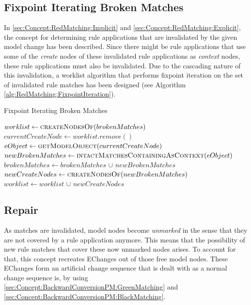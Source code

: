 \subsection{Fixpoint Iterating Broken Matches}
\label{sec:Concept:RedMatching:FixpointIteration}
In \autoref{sec:Concept:RedMatching:Implicit} and \autoref{sec:Concept:RedMatching:Explicit}, the concept for determining rule applications that are invalidated by the given model change has been described.
Since there might be rule applications that use some of the \emph{create} nodes of these invalidated rule applications as \emph{context} nodes, these rule applications must also be invalidated. 
Due to the cascading nature of this invalidation, a worklist algorithm that performs fixpoint iteration on the set of invalidated rule matches has been designed (see Algorithm \autoref{alg:RedMatching:FixpointIteration}).

\begin{algorithm}
    \caption{Fixpoint Iterating Broken Matches}
    \label{alg:RedMatching:FixpointIteration}
    \begin{algorithmic}
            \State $worklist \gets \Call{createNodesOf}{brokenMatches}$
                \State $currentCreateNode \gets worklist.remove()$
                \State $eObject \gets \Call{getModelObject}{currentCreateNode}$
                \State $newBrokenMatches \gets \Call{intactMatchesContainingAsContext}{eObject}$
                \State $brokenMatches \gets brokenMatches$ $\cup$ $newBrokenMatches$
                \State $newCreateNodes \gets \Call{createNodesOf}{newBrokenMatches}$
                \State $worklist \gets worklist$ $\cup$ $newCreateNodes$
            \EndWhile
        \EndFunction
    \end{algorithmic}    
\end{algorithm}

\subsection{Repair}
\label{sec:Concept:RedMatching:Repair}
As matches are invalidated, model nodes become \emph{unmarked} in the sense that they are not covered by a rule application anymore.
This means that the possibility of new rule matches that cover these now unmarked nodes arises.
To account for that, this concept recreates EChanges out of those free model nodes. These EChanges form an artificial change sequence that is dealt with as a normal change sequence is, by using \autoref{sec:Concept:BackwardConversionPM:GreenMatching} and \autoref{sec:Concept:BackwardConversionPM:BlackMatching}.

